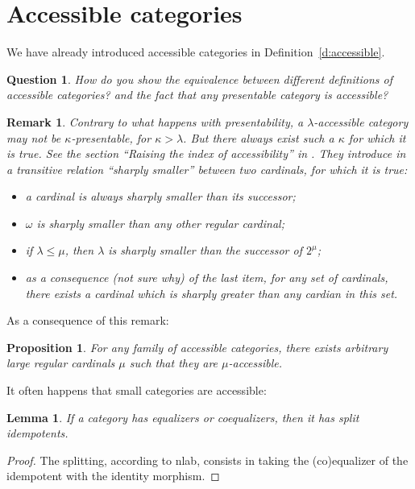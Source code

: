 \documentclass{article}
\newtheorem{proposition}[theorem]{Proposition}
\newtheorem{question}[theorem]{Question}
\newtheorem{remark}[theorem]{Remark}
\newtheorem{lemma}[theorem]{Lemma}
\begin{document}
\section{Accessible categories}
We have already introduced accessible categories in Definition~\ref{d:accessible}.
\begin{question}
  How do you show the equivalence between different definitions of accessible
  categories? and the fact that any presentable category is accessible?
\end{question}
\begin{remark}
 Contrary to what happens with presentability,
 a $\lambda$-accessible category may not be $\kappa$-presentable, for $\kappa > \lambda$.
 But there always exist such a $\kappa$ for which it is true.
 See the section ``Raising the index of accessibility'' in \cite{adamek_rosicky}.
 They introduce in \cite[2.12]{adamek_rosicky} a transitive relation ``sharply smaller''
 between two cardinals, for which it is true:
 \begin{itemize}
 \item 
   a cardinal is always
   sharply smaller than its successor;
   \item $\omega$ is sharply smaller than any other regular cardinal;
     \item if $\lambda\leq \mu$, then $\lambda$ is sharply smaller than
       the successor of $2^\mu$;
      \item as a consequence (not sure why) of the last item, for any set of cardinals, there
        exists a cardinal which is sharply greater than any cardian in this set.
 \end{itemize}
\end{remark}
As a consequence of this remark:
\begin{proposition}
  For any family of accessible categories,
  there exists arbitrary large regular
 cardinals $\mu$ such that they are $\mu$-accessible.
\end{proposition}
It often happens that small categories are accessible:
\begin{lemma}
 If a category has equalizers or coequalizers, then it has split idempotents.
\end{lemma}
\begin{proof}
 The splitting, according to nlab, consists in taking the (co)equalizer of the
 idempotent with the identity morphism.
\end{proof}
\end{document}
